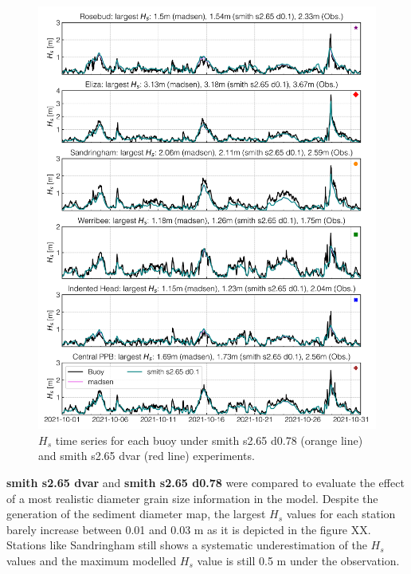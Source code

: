 \documentclass[12pt]{article}
\begin{document}
\begin{figure}[h]
    \centering
    \includegraphics[scale=0.7]{plots/hs_series/madsen_vs_smith s2.65 d0.1_vert.png}
    \caption{$H_{s}$ time series for each buoy under smith s2.65 d0.78 (orange line) and smith s2.65 dvar (red line) experiments.}
    \label{fig:hs_smith_0.78_vs_smith_dvar}
\end{figure}

\textbf{smith s2.65 dvar} and \textbf{smith s2.65 d0.78} were compared to evaluate the effect of a most realistic diameter grain size information in the model. Despite the generation of the sediment diameter map, the largest $H_s$ values for each station barely increase between 0.01 and 0.03 m as it is depicted in the figure XX. Stations like Sandringham still shows a systematic underestimation of the $H_s$ values and the maximum modelled $H_s$ value is still 0.5 m under the observation. 
\end{document}
